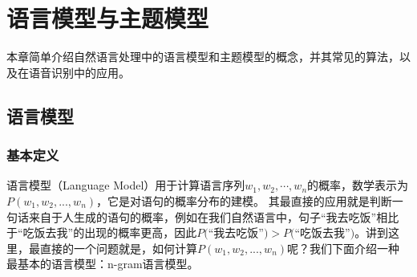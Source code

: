 %
%
%
\chapter{语言模型与主题模型}
\label{lm} 

本章简单介绍自然语言处理中的语言模型和主题模型的概念，并其常见的算法，以及在语音识别中的应用。


\section{语言模型}

\subsection{基本定义}

语言模型（Language Model）用于计算语言序列$w_1, w_2, \cdots, w_n$的概率，数学表示为$P(w_1, w_2, ..., w_n)$，它是对语句的概率分布的建模。
其最直接的应用就是判断一句话来自于人生成的语句的概率，例如在我们自然语言中，句子``我去吃饭''相比于``吃饭去我''的出现的概率更高，因此$P($``我去吃饭''$) > P($``吃饭去我''$)$。讲到这里，最直接的一个问题就是，如何计算$P(w_1, w_2, ..., w_n)$呢？我们下面介绍一种最基本的语言模型：n-gram语言模型。

